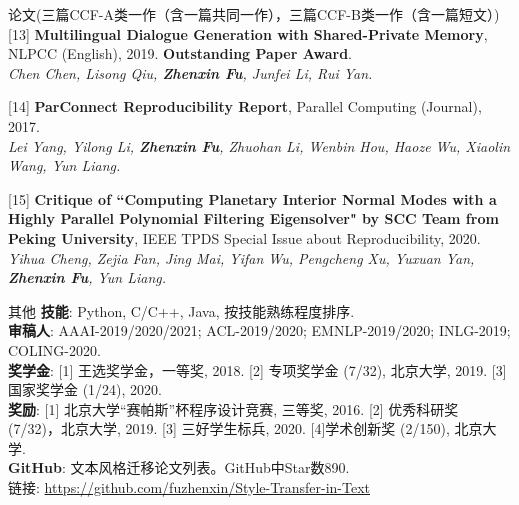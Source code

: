 \documentclass{resume} %
\begin{document}
\begin{rSection}{论文(三篇CCF-A类一作（含一篇共同一作），三篇CCF-B类一作（含一篇短文）)}
    [13] \textbf{Multilingual Dialogue Generation with Shared-Private Memory}, NLPCC (English), 2019. \textbf{Outstanding Paper Award}. \\
    {\it Chen Chen, Lisong Qiu, \textbf{Zhenxin Fu}, Junfei Li, Rui Yan. }
    \vspace{-0.1cm}

    [14] \textbf{ParConnect Reproducibility Report}, Parallel Computing (Journal), 2017.\\
    {\it Lei Yang, Yilong Li, \textbf{Zhenxin Fu}, Zhuohan Li, Wenbin Hou, Haoze Wu, Xiaolin Wang, Yun Liang.}
    \vspace{-0.1cm}

    [15] \textbf{Critique of ``Computing Planetary Interior Normal Modes with a Highly Parallel Polynomial Filtering Eigensolver" by SCC Team from Peking University}, IEEE TPDS Special Issue about Reproducibility, 2020. \\
    {\it Yihua Cheng, Zejia Fan, Jing Mai, Yifan Wu, Pengcheng Xu, Yuxuan Yan, \textbf{Zhenxin Fu}, Yun Liang.}
    \vspace{-0.1cm}
\end{rSection}

\vspace{-0.2cm}
\begin{rSection}{其他}
    \textbf{技能}: Python, C/C++, Java, 按技能熟练程度排序. \\
    \textbf{审稿人}: AAAI-2019/2020/2021; ACL-2019/2020; EMNLP-2019/2020; INLG-2019; COLING-2020. \\
    \textbf{奖学金}: [1] 王选奖学金，一等奖, 2018. [2] 专项奖学金 (7/32), 北京大学, 2019. [3] 国家奖学金 (1/24), 2020.\\
    \textbf{奖励}: [1] 北京大学``赛帕斯''杯程序设计竞赛, 三等奖, 2016. [2] 优秀科研奖 (7/32)，北京大学, 2019. [3] 三好学生标兵, 2020. [4]学术创新奖 (2/150), 北京大学.\\
    \textbf{GitHub}: 文本风格迁移论文列表。GitHub中Star数890. \\链接: \url{https://github.com/fuzhenxin/Style-Transfer-in-Text}
\end{rSection}
\end{document}

